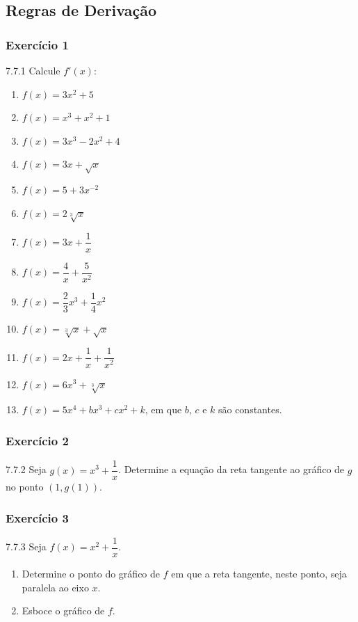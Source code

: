 \clearpage

\subsection{Regras de Derivação}

\subsubsection*{Exercício 1}
\begin{exercicio}[1]{7.7.1}
Calcule $f'(x)$:
\begin{enumerate}[label=\alph*)]
    \item $f(x) = 3x^2 + 5$
    \item $f(x) = x^3 + x^2 + 1$
    \item $f(x) = 3x^3 - 2x^2 + 4$
    \item $f(x) = 3x + \sqrt{x}$
    \item $f(x) = 5 + 3x^{-2}$
    \item $f(x) = 2\sqrt[3]{x}$
    \item $f(x) = 3x + \dfrac{1}{x}$
    \item $f(x) = \dfrac{4}{x} + \dfrac{5}{x^2}$
    \item $f(x) = \dfrac{2}{3}x^3 + \dfrac{1}{4}x^2$
    \item $f(x) = \sqrt[3]{x} + \sqrt{x}$
    \item $f(x) = 2x + \dfrac{1}{x} + \dfrac{1}{x^2}$
    \item $f(x) = 6x^3 + \sqrt[3]{x}$
    \item $f(x) = 5x^4 + bx^3 + cx^2 + k$, em que $b$, $c$ e $k$ são constantes.
\end{enumerate}
\end{exercicio}

\subsubsection*{Exercício 2}
\begin{exercicio}[2]{7.7.2}
Seja $g(x) = x^3 + \dfrac{1}{x}$. Determine a equação da reta tangente ao gráfico de $g$ no ponto $(1, g(1))$.
\end{exercicio}

\subsubsection*{Exercício 3}
\begin{exercicio}[3]{7.7.3}
Seja $f(x) = x^2 + \dfrac{1}{x}$.
\begin{enumerate}[label=\alph*)]
    \item Determine o ponto do gráfico de $f$ em que a reta tangente, neste ponto, seja paralela ao eixo $x$.
    \item Esboce o gráfico de $f$.
\end{enumerate}
\end{exercicio}

